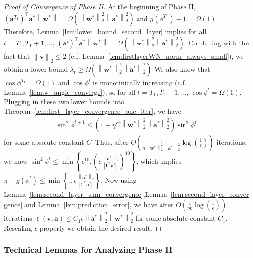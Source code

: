 \documentclass{article}
\newcommand{\firstlayer}{w}
\newcommand{\firstlayerWN}{v}
\newcommand{\secondlayer}{a}
\newcommand{\vect}[1]{\mathbf{#1}}
\newcommand{\norm}[1]{\left\|#1\right\|}
\newcommand{\abs}[1]{\left|#1\right|}
\begin{document}
\begin{proof}[Proof of Convergence of Phase II]
At the beginning of Phase II,  $\left(\vect{\secondlayer}^{T_1}\right)^\top \vect{\secondlayer}^*\norm{\vect{\firstlayer}^*} = \Omega\left(\norm{\vect{\firstlayer}^*}_2^2\norm{\vect{\secondlayer}^*}_2^2\right)$ and $g(\phi^{T_1}) - 1 = \Omega\left(1\right)$.
Therefore, Lemma~\ref{lem:lower_bound_second_layer} implies for all $t=T_1,T_1+1,\ldots$, $\left(\vect{\secondlayer}^{t}\right)^\top \vect{\secondlayer}^*\norm{\vect{\firstlayer}^*} = \Omega\left(\norm{\vect{\firstlayer}^*}_2^2\norm{\vect{\secondlayer}^*}_2^2\right)$.
Combining with the fact that $\norm{\vect{\firstlayerWN}}_2 \le 2$ (c.f. Lemma~\ref{lem:firstlayerWN_norm_always_small}), we obtain a lower bound $\lambda_t \ge \Omega\left(\norm{\vect{\firstlayer}^*}_2^2\norm{\vect{\secondlayer}^*}_2^2\right)$
We also know that
$\cos \phi^{T_1} = \Omega\left(1\right)$ and $\cos\phi^t$ is monotinically increasing (c.f. Lemma~\ref{lem:w_angle_converge}), so for all $t=T_1,T_1+1,\ldots$, $\cos\phi^t = \Omega\left(1\right)$.
Plugging in these two lower bounds into Theorem~\ref{lem:first_layer_convergence_one_iter}, we have \begin{align*}
\sin^2\phi^{t+1}  \le \left(1-\eta C\norm{\vect{\firstlayer}^*}_2^2\norm{\vect{\secondlayer}^*}_2^2\right)\sin^2\phi^t.
\end{align*} for some absolute constant $C$.
Thus, after $O\left(\frac{1}{\eta\norm{\vect{\firstlayer}^*}_2^2\norm{\vect{\secondlayer}^*}_2^2}\log\left(\frac{1}{\epsilon}\right)\right)$ iterations, we have $\sin^2\phi^t \le \min\left\{\epsilon^{10},\left(\epsilon\frac{\norm{\vect{\secondlayer}^*}_2}{\abs{\vect{1}^\top \vect{\secondlayer}^*}}\right)^{10}\right\}$, which implies $\pi- g(\phi^t) \le \min\left\{\epsilon,\epsilon\frac{\norm{\vect{\secondlayer}^*}_2}{\abs{\vect{1}^\top \vect{\secondlayer}^*}} \right\}$.
Now using Lemma~\ref{lem:second_layer_sum_convergence},Lemma~\ref{lem:second_layer_convergence} and Lemma~\ref{lem:prediction_error}, we have after $\widetilde{O}\left(
\frac{1}{\eta k}\log\left(\frac{1}{\epsilon}\right)
\right)$ iterations $\ell\left(\vect{\firstlayerWN},\vect{\secondlayer}\right) \le C_1\epsilon \norm{\vect{\secondlayer}^*}_2^2\norm{\vect{\firstlayer}^*}_2^2$ for some absolute constant $C_1$.
Rescaling $\epsilon$ properly we obtain the desired result.
\end{proof}\subsubsection{Technical Lemmas for Analyzing Phase II}\label{lem:}
\end{document}
